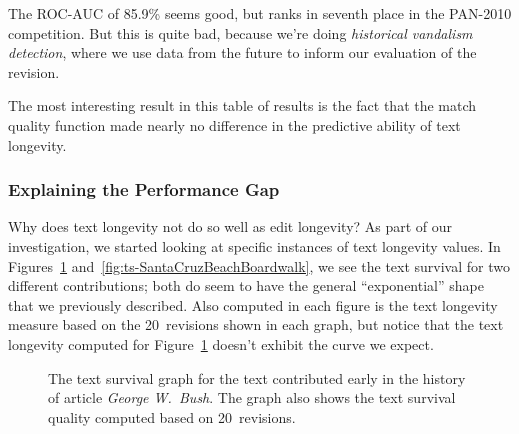 The ROC-AUC of 85.9\% seems good, but ranks in seventh place
in the PAN-2010 competition.
But this is quite bad, because we're doing \textit{historical
vandalism detection}, where we use data from the future to
inform our evaluation of the revision.

The most interesting result in this table of results
is the fact that the match quality function made
nearly no difference in the predictive ability of
text longevity.




\subsubsection{Explaining the Performance Gap}

Why does text longevity not do so well as edit longevity?
As part of our investigation, we started looking at specific
instances of text longevity values.
In Figures~\ref{fig:ts-GeorgeWBush} and~\ref{fig:ts-SantaCruzBeachBoardwalk},
we see the text survival for two different contributions;
both do seem to have the general ``exponential'' shape
that we previously described.
Also computed in each figure is the text longevity measure based on
the 20~revisions shown in each graph, but notice that the text
longevity computed for
Figure~\ref{fig:ts-GeorgeWBush} doesn't exhibit the curve we expect.

\begin{figure}[tbph]
\centering
{}
\caption{The text survival graph for the text contributed early
        in the history of article \textit{George W.~Bush}.
	The graph also shows the text survival quality
	computed based on 20~revisions.
	}
\label{fig:ts-GeorgeWBush}
\end{figure}

